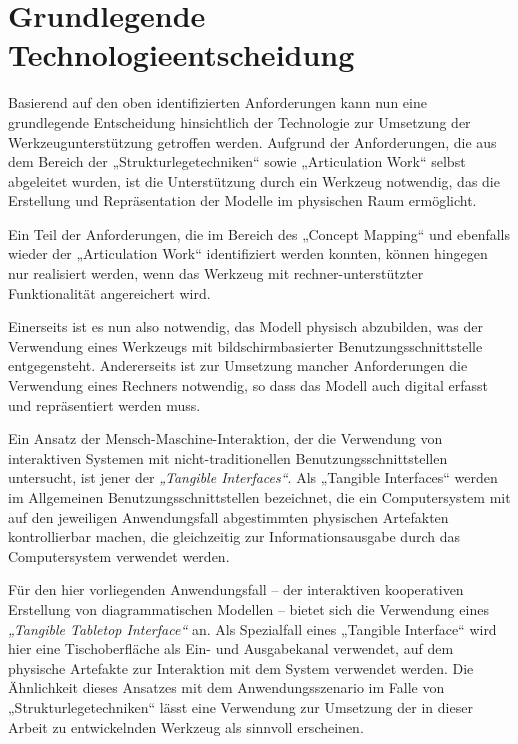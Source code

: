 

\section{Grundlegende Technologieentscheidung} %
\label{sec:grundlegende_technologieentscheidung}

Basierend auf den oben identifizierten Anforderungen kann nun eine grundlegende Entscheidung hinsichtlich der Technologie zur Umsetzung der Werkzeugunterstützung getroffen werden. Aufgrund der Anforderungen, die aus dem Bereich der „Strukturlegetechniken“ sowie „Articulation Work“ selbst abgeleitet wurden, ist die Unterstützung durch ein Werkzeug notwendig, das die Erstellung und Repräsentation der Modelle im physischen Raum ermöglicht.

Ein Teil der Anforderungen, die im Bereich des „Concept Mapping“ und ebenfalls wieder der „Articulation Work“ identifiziert werden konnten, können hingegen nur realisiert werden, wenn das Werkzeug mit rechner-unterstützter Funktionalität angereichert wird.

Einerseits ist es nun also notwendig, das Modell physisch abzubilden, was der Verwendung eines Werkzeugs mit  bildschirmbasierter Benutzungsschnittstelle entgegensteht. Andererseits ist zur Umsetzung mancher Anforderungen die Verwendung eines Rechners notwendig, so dass das Modell auch digital erfasst und repräsentiert werden muss.

Ein Ansatz der Mensch-Maschine-Interaktion, der die Verwendung von interaktiven Systemen mit nicht-traditionellen Benutzungsschnittstellen untersucht, ist jener der \emph{„Tangible Interfaces“}. Als „Tangible Interfaces“ werden im Allgemeinen Benutzungsschnittstellen bezeichnet, die ein Computersystem mit auf den jeweiligen Anwendungsfall abgestimmten physischen Artefakten kontrollierbar machen, die gleichzeitig zur Informationsausgabe durch das Computersystem verwendet werden.

Für den hier vorliegenden Anwendungsfall -- der interaktiven kooperativen Erstellung von diagrammatischen Modellen -- bietet sich die Verwendung eines \emph{„Tangible Tabletop Interface“} an. Als Spezialfall eines „Tangible Interface“ wird hier eine Tischoberfläche als Ein- und Ausgabekanal verwendet, auf dem physische Artefakte zur Interaktion mit dem System verwendet werden. Die Ähnlichkeit dieses Ansatzes mit dem Anwendungsszenario im Falle von „Strukturlegetechniken“ lässt eine Verwendung zur Umsetzung der in dieser Arbeit zu entwickelnden Werkzeug als sinnvoll erscheinen. 

